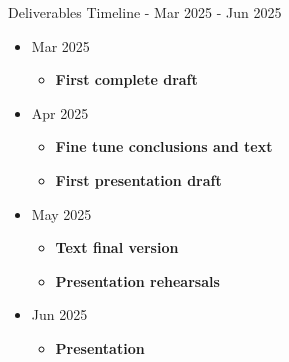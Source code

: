 \documentclass{beamer}
\begin{document}
\begin{frame}{Deliverables Timeline - Mar 2025 - Jun 2025}
    \begin{itemize}
        \item Mar 2025
            \begin{itemize}
                \item \textbf{First complete draft}
            \end{itemize}
        \item Apr 2025
            \begin{itemize}
                \item \textbf{Fine tune conclusions and text}
                \item \textbf{First presentation draft}
            \end{itemize}
        \item May 2025
            \begin{itemize}
                \item \textbf{Text final version}
                \item \textbf{Presentation rehearsals}
            \end{itemize}
        \item Jun 2025
            \begin{itemize}
                \item \textbf{Presentation}
            \end{itemize}
    \end{itemize}
\end{frame}
\end{document}
